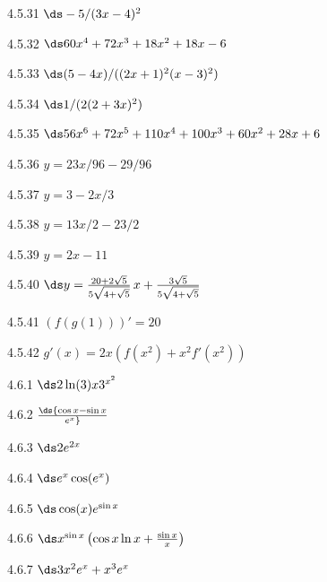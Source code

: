 \begin{Answer}{4.5.31}
$\ds -5/(3x-4)^2$
\end{Answer}
\begin{Answer}{4.5.32}
$\ds 60x^4+72x^3+18x^2+18x-6$
\end{Answer}
\begin{Answer}{4.5.33}
$\ds (5-4x)/((2x+1)^2(x-3)^2)$
\end{Answer}
\begin{Answer}{4.5.34}
$\ds 1/(2(2+3x)^2)$
\end{Answer}
\begin{Answer}{4.5.35}
$\ds 56x^6+72x^5+110x^4+100x^3+60x^2+28x+6$
\end{Answer}
\begin{Answer}{4.5.36}
$y=23x/96-29/96$
\end{Answer}
\begin{Answer}{4.5.37}
$y=3-2x/3$
\end{Answer}
\begin{Answer}{4.5.38}
$y=13x/2-23/2$
\end{Answer}
\begin{Answer}{4.5.39}
$y=2x-11$
\end{Answer}
\begin{Answer}{4.5.40}
$\ds y={20+2\sqrt5\over5\sqrt{4+\sqrt5}}\,x+{3\sqrt5\over5\sqrt{4+\sqrt5}}$
\end{Answer}
\begin{Answer}{4.5.41}
	$(f(g(1)))'=20$
\end{Answer}
\begin{Answer}{4.5.42}
	$g'(x)=2x(f(x^2)+x^2f'(x^2))$
\end{Answer}
\begin{Answer}{4.6.1}
	$\ds 2\ln(3)x3^{x^2}$
\end{Answer}
\begin{Answer}{4.6.2}
	$\ds {\cos x-\sin x \over e^x}$
\end{Answer}
\begin{Answer}{4.6.3}
	$\ds 2e^{2x}$
\end{Answer}
\begin{Answer}{4.6.4}
	$\ds e^x\cos(e^x)$
\end{Answer}
\begin{Answer}{4.6.5}
	$\ds  \cos (x) e^{\sin x}$
\end{Answer}
\begin{Answer}{4.6.6}
	$\ds x^{\sin x}\left(\cos x\ln x+{\sin x\over x}\right)$
\end{Answer}
\begin{Answer}{4.6.7}
	$\ds 3x^2e^x+x^3e^x$
\end{Answer}
